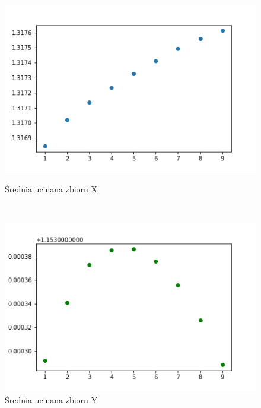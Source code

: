 \documentclass[12pt]{mwart}
\begin{document}
\begin{figure}[H]
	\begin{minipage}{.5\linewidth}
		\centering
		\includegraphics[scale=0.7]{X_trim.PNG}
		\caption{Średnia ucinana zbioru X}
	\end{minipage}
	$\quad$
	\begin{minipage}{.5\linewidth}
		\centering
		\includegraphics[scale=0.7]{Y_trim.PNG}
		\caption{Średnia ucinana zbioru Y}
	\end{minipage}
\end{figure}
\end{document}
